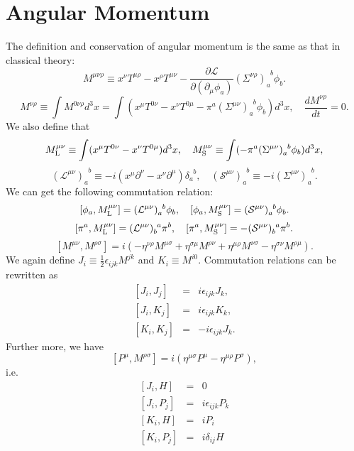 \section{Angular Momentum}
\noindent
The definition and conservation of angular momentum is the same as that in classical theory:
\[M^{\mu \nu \rho} \equiv x^{\nu}T^{\mu \rho} - x^{\rho} T^{\mu \nu} - \frac{\partial \mathcal{L}}{\partial (\partial_{\mu}\phi_a)}(\Sigma^{\nu \rho})_{a}^{\phantom{a}b}\phi_b.\]
\[M^{\nu \rho} \equiv \int M^{0 \nu \rho} d^3 x = \int (x^{\mu}T^{0\nu}-x^{\nu}T^{0\mu}-\pi^a(\Sigma^{\mu \nu})_{a}^{\phantom{a}b}\phi_b) d^3 x, \quad \frac{dM^{\nu \rho}}{dt} = 0.\]
We also define that
\[M_{\rm L}^{\mu \nu} \equiv \int (x^{\mu}T^{0\nu}-x^{\nu}T^{0\mu}) d^3 x , \quad M_{\rm S}^{\mu \nu} \equiv\int (-\pi^a(\Sigma^{\mu \nu})_{a}^{\phantom{a}b}\phi_b) d^3 x,\]
\[(\mathcal{L}^{\mu \nu})_a^{\phantom{a}b} \equiv -i(x^{\mu}\partial^{\nu}-x^{\nu}\partial^{\mu})\delta_a^{\phantom{a}b} , \quad (\mathcal{S}^{\mu \nu})_a^{\phantom{a}b} \equiv -i(\Sigma^{\mu \nu})_a^{\phantom{a}b}.\]
We can get the following commutation relation:
\[[\phi_a,M_{\rm L}^{\mu \nu}] = (\mathcal{L}^{\mu \nu})_a^{\phantom{a}b} \phi_b , \quad [\phi_a,M_{\rm S}^{\mu \nu}] = (\mathcal{S}^{\mu \nu})_a^{\phantom{a}b} \phi_b.\]
\[[\pi^a,M_{\rm L}^{\mu \nu}] = (\mathcal{L}^{\mu \nu})_b^{\phantom{b}a}\pi^{b}  , \quad [\pi^a,M_{\rm S}^{\mu \nu}] = - (\mathcal{S}^{\mu \nu})_b^{\phantom{b}a} \pi^b .\]
\[[M^{\mu \nu},M^{\rho \sigma}] = i(-\eta^{\nu \rho}M^{\mu \sigma} + \eta^{\sigma \mu}M^{\rho \nu} + \eta^{\mu \rho}M^{\nu \sigma} - \eta^{\sigma \nu}M^{\rho \mu}).\]
We again define $J_i \equiv \frac{1}{2} \epsilon_{ijk} M^{jk}$ and $K_i \equiv M^{i0}$. Commutation relations can be rewritten as
\begin{eqnarray}
\left[J_i,J_j\right] &=& i\epsilon_{ijk}J_k ,\nonumber \\
\left[J_i,K_j\right] &=& i\epsilon_{ijk}K_k ,\nonumber \\
\left[K_i,K_j\right] &=& -i\epsilon_{ijk}J_k .\nonumber
\end{eqnarray}
Further more, we have
\[[P^{\mu},M^{\rho \sigma}] = i(\eta^{\mu \sigma}P^{\mu} - \eta^{\mu \rho}P^{\sigma}),\]
i.e.
\begin{eqnarray}
\left[J_i,H\right] &=& 0 \nonumber \\
\left[J_i,P_j\right] &=& i\epsilon_{ijk}P_k \nonumber \\
\left[K_i,H\right] &=& iP_i \nonumber \\
\left[K_i,P_j\right] &=& i\delta_{ij}H \nonumber
\end{eqnarray}
